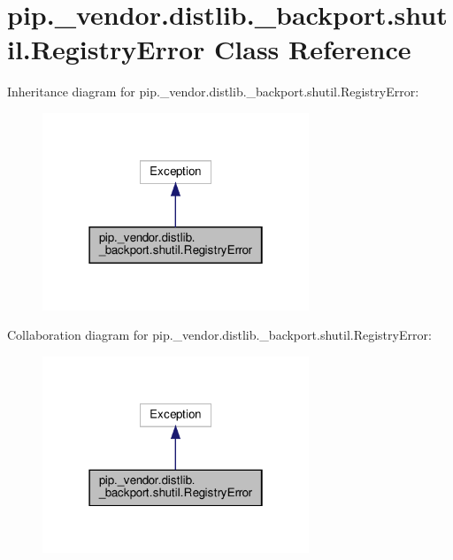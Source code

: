 \hypertarget{classpip_1_1__vendor_1_1distlib_1_1__backport_1_1shutil_1_1RegistryError}{}\section{pip.\+\_\+vendor.\+distlib.\+\_\+backport.\+shutil.\+Registry\+Error Class Reference}
\label{classpip_1_1__vendor_1_1distlib_1_1__backport_1_1shutil_1_1RegistryError}


Inheritance diagram for pip.\+\_\+vendor.\+distlib.\+\_\+backport.\+shutil.\+Registry\+Error\+:
\nopagebreak
\begin{figure}[H]
\begin{center}
\leavevmode
\includegraphics[width=226pt]{classpip_1_1__vendor_1_1distlib_1_1__backport_1_1shutil_1_1RegistryError__inherit__graph}
\end{center}
\end{figure}


Collaboration diagram for pip.\+\_\+vendor.\+distlib.\+\_\+backport.\+shutil.\+Registry\+Error\+:
\nopagebreak
\begin{figure}[H]
\begin{center}
\leavevmode
\includegraphics[width=226pt]{classpip_1_1__vendor_1_1distlib_1_1__backport_1_1shutil_1_1RegistryError__coll__graph}
\end{center}
\end{figure}


